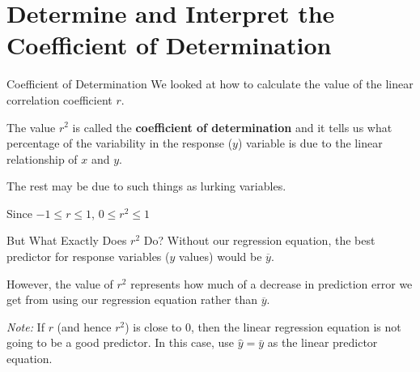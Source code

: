 \documentclass[t]{beamer}
\begin{document}
\section{Determine and Interpret the Coefficient of Determination}

\begin{frame}{Coefficient of Determination}
We looked at how to calculate the value of the linear correlation coefficient $r$. \newline\\	\pause

The value $r^2$ is called the {\color{blue}\textbf{coefficient of determination}} and it tells us what percentage of the variability in the response ($y$) variable is due to the linear relationship of $x$ and $y$. \newline\\ \pause

The rest may be due to such things as lurking variables.	\newline\\	\pause

Since $-1 \leq r \leq 1$, $0 \leq r^2 \leq 1$
\end{frame}

\begin{frame}{But What Exactly Does $r^2$ Do?}
Without our regression equation, the best predictor for response variables ($y$ values) would be $\overline{y}$. \newline\\	\pause

However, the value of $r^2$ represents how much of a decrease in prediction error we get from using our regression equation rather than $\overline{y}$. \newline\\	\pause

\emph{Note:} If $r$ (and hence $r^2$) is close to 0, then the linear regression equation is not going to be a good predictor. In this case, use $\hat{y} = \bar{y}$ as the linear predictor equation.
\end{frame}
\end{document}
